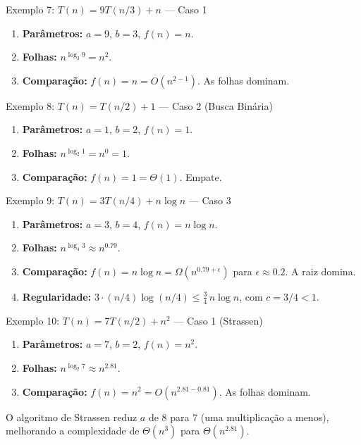 \documentclass[aspectratio=169]{beamer}
\begin{document}
\begin{frame}{Exemplo 7: $T(n) = 9T(n/3) + n$ {\normalfont\small--- Caso 1}}
    \begin{enumerate}
        \item \textbf{Parâmetros:} $a = 9$, $b = 3$, $f(n) = n$.
        \item \textbf{Folhas:} $n^{\log_3 9} = n^2$.
        \item \textbf{Comparação:} $f(n) = n = O(n^{2-1})$. As folhas dominam.
    \end{enumerate}
    \hfill{}
\end{frame}

\begin{frame}{Exemplo 8: $T(n) = T(n/2) + 1$ {\normalfont\small--- Caso 2 (Busca Binária)}}
    \begin{enumerate}
        \item \textbf{Parâmetros:} $a = 1$, $b = 2$, $f(n) = 1$.
        \item \textbf{Folhas:} $n^{\log_2 1} = n^0 = 1$.
        \item \textbf{Comparação:} $f(n) = 1 = \Theta(1)$. Empate.
    \end{enumerate}
    \hfill{}
\end{frame}

\begin{frame}{Exemplo 9: $T(n) = 3T(n/4) + n \log n$ {\normalfont\small--- Caso 3}}
    \begin{enumerate}
        \item \textbf{Parâmetros:} $a = 3$, $b = 4$, $f(n) = n \log n$.
        \item \textbf{Folhas:} $n^{\log_4 3} \approx n^{0.79}$.
        \item \textbf{Comparação:} $f(n) = n\log n = \Omega(n^{0.79+\epsilon})$ para $\epsilon \approx 0.2$. A raiz domina.
        \item \textbf{Regularidade:} $3 \cdot (n/4)\log(n/4) \le \frac{3}{4}\,n\log n$, com $c = 3/4 < 1$. \checkmark
    \end{enumerate}
    \hfill{}
\end{frame}

\begin{frame}{Exemplo 10: $T(n) = 7T(n/2) + n^2$ {\normalfont\small--- Caso 1 (Strassen)}}
    \begin{enumerate}
        \item \textbf{Parâmetros:} $a = 7$, $b = 2$, $f(n) = n^2$.
        \item \textbf{Folhas:} $n^{\log_2 7} \approx n^{2.81}$.
        \item \textbf{Comparação:} $f(n) = n^2 = O(n^{2.81 - 0.81})$. As folhas dominam.
    \end{enumerate}
    
    \hfill{}
    
    \vspace{0.3cm}
    {\small O algoritmo de Strassen reduz $a$ de 8 para 7 (uma multiplicação a menos), melhorando a complexidade de $\Theta(n^3)$ para $\Theta(n^{2.81})$.}
\end{frame}
\end{document}
